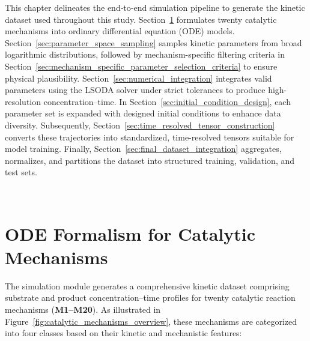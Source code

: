 \documentclass{dissertation}
\begin{document}
\noindent
This chapter delineates the end‑to‑end simulation pipeline to generate the kinetic dataset used throughout this study. Section~\ref{sec:ODE_formalism} formulates twenty catalytic mechanisms into ordinary differential equation (ODE) models. Section~\ref{sec:parameter_space_sampling} samples kinetic parameters from broad logarithmic distributions, followed by mechanism-specific filtering criteria in Section~\ref{sec:mechanism_specific_parameter_selection_criteria} to ensure physical plausibility. Section~\ref{sec:numerical_integration} integrates valid parameters using the LSODA solver under strict tolerances to produce high-resolution concentration–time. In Section~\ref{sec:initial_condition_design}, each parameter set is expanded with designed initial conditions to enhance data diversity. Subsequently, Section~\ref{sec:time_resolved_tensor_construction} converts these trajectories into standardized, time-resolved tensors suitable for model training. Finally, Section~\ref{sec:final_dataset_integration} aggregates, normalizes, and partitions the dataset into structured training, validation, and test sets.

\\

\section{ODE Formalism for Catalytic Mechanisms}
\label{sec:ODE_formalism}

The simulation module generates a comprehensive kinetic dataset comprising substrate and product concentration–time profiles for twenty catalytic reaction mechanisms (\textbf{M1–M20}). As illustrated in Figure~\ref{fig:catalytic_mechanisms_overview}, these mechanisms are categorized into four classes based on their kinetic and mechanistic features: 
\end{document}
